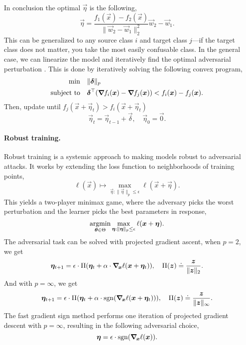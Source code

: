 In conclusion the optimal $\vec{\eta}$ is the following, \[
    \vec{\eta} = \frac{f_1(\vec{x}) - f_2(\vec{x})}{\| \vec{w}_2 - \vec{w}_1 \|^2_2} \vec{w}_2 - \vec{w}_1.
\]
This can be generalized to any source class $i$ and target class $j$---if the target class does not
matter, you take the most easily confusable class. In the general case, we can linearize the model
and iteratively find the optimal adversarial perturbation \citep{moosavi2016deepfool}. This is done
by iteratively solving the following convex program,
\begin{align*}
    \min              & \quad \| \vec{\delta} \|_p                                                                                              \\
    \text{subject to} & \quad \transpose{\vec{\delta}} \lft( \grad{f_i(\vec{x})}{} - \grad{f_j(\vec{x})}{} \rgt) < f_i(\vec{x}) - f_j(\vec{x}).
\end{align*}
Then, update until $f_j(\vec{x} + \vec{\eta}_t) > f_i(\vec{x} + \vec{\eta}_t)$ \[
    \vec{\eta}_t = \vec{\eta}_{t-1} + \vec{\delta}, \quad \vec{\eta}_0 = \vec{0}.
\]

\paragraph{Robust training.}

Robust training is a systemic approach to making models robust to adversarial attacks. It works by
extending the loss function to neighborhoods of training points, \[
    \ell(\vec{x}) \mapsto \max_{\vec{\eta} : \| \vec{\eta} \|_p \leq \epsilon} \ell(\vec{x} + \vec{\eta}).
\]
This yields a two-player minimax game, where the adversary picks the worst perturbation and the
learner picks the best parameters in response, \[
    \operatorname*{argmin}_{\bm{\theta} \in \Theta} \max_{\bm{\eta} : \| \bm{\eta} \|_p \leq \epsilon} \ell(\bm{x} + \bm{\eta}).
\]
The adversarial task can be solved with projected gradient ascent, \eg when $p=2$, we get \[
    \vec{\eta}_{t+1} = \epsilon \cdot \Pi \lft( \vec{\eta}_t + \alpha \cdot \grad{\ell(\vec{x} + \vec{\eta}_t)}{\vec{x}} \rgt), \quad \Pi(\vec{z}) \doteq \frac{\vec{z}}{\| \vec{z} \|_2}.
\]
And with $p=\infty$, we get \[
    \vec{\eta}_{t+1} = \epsilon \cdot \Pi \lft( \vec{\eta}_t + \alpha \cdot \mathrm{sgn} \lft( \grad{\ell(\vec{x} + \vec{\eta}_t)}{\vec{x}} \rgt) \rgt), \quad \Pi(\vec{z}) \doteq \frac{\vec{z}}{\| \vec{z} \|_\infty}.
\]
The fast gradient sign method \citep{goodfellow2014explaining} performs one iteration of projected
gradient descent with $p=\infty$, resulting in the following adversarial choice, \[
    \vec{\eta} = \epsilon \cdot \mathrm{sgn} \lft( \grad{\ell(\vec{x})}{\vec{x}} \rgt).
\]

